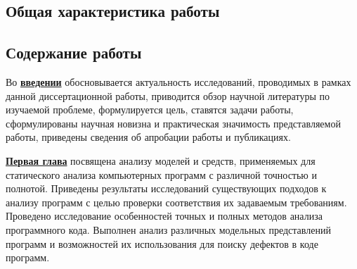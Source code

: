 \subsection*{Общая характеристика работы}

\newcommand{\actuality}{\underline{\textbf{Актуальность темы.}}}
\newcommand{\aim}{\underline{\textbf{Целью}}}
\newcommand{\tasks}{\underline{\textbf{задачи}}}
\newcommand{\defpositions}{\underline{\textbf{Основные положения, выносимые на~защиту:}}}
\newcommand{\novelty}{\underline{\textbf{Научная новизна:}}}
\newcommand{\influence}{\underline{\textbf{Практическая значимость}}}
\newcommand{\reliability}{\underline{\textbf{Достоверность}}}
\newcommand{\probation}{\underline{\textbf{Апробация работы.}}}
\newcommand{\contribution}{\underline{\textbf{Личный вклад.}}}
\newcommand{\publications}{\underline{\textbf{Публикации.}}}




\subsection*{Содержание работы}
Во \underline{\textbf{введении}} обосновывается актуальность исследований, проводимых в рамках данной диссертационной работы, приводится обзор научной литературы по изучаемой проблеме, формулируется цель, ставятся задачи работы, сформулированы научная новизна и практическая значимость представляемой работы, приведены сведения об апробации работы и публикациях.

\underline{\textbf{Первая глава}} посвящена анализу моделей и средств, применяемых для статического анализа компьютерных программ с различной точностью и полнотой. Приведены результаты исследований существующих подходов к анализу программ с целью проверки соответствия их задаваемым требованиям. Проведено исследование особенностей точных и полных методов анализа программного кода. Выполнен анализ различных модельных представлений программ и возможностей их использования для поиску дефектов в коде программ.

